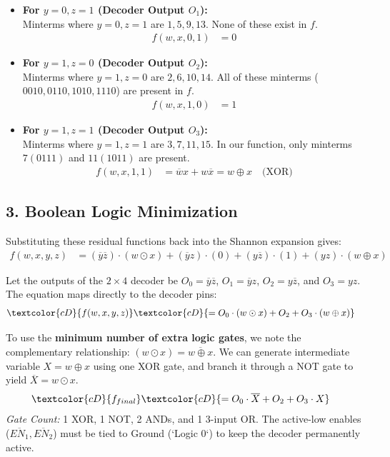\documentclass[12pt,a3paper]{article}
\begin{document}
\begin{enumerate}
\begin{tcolorbox}[enhanced,breakable,ansbox,colback=cD!4,colframe=cD,boxrule=0.8pt,arc=5pt,title={\textbf{Answer}},fonttitle=\bfseries\color{white},colbacktitle=cD]
\begin{itemize}
    \item \textbf{For $y=0, z=1$ (Decoder Output $O_1$):}\\
    Minterms where $y=0, z=1$ are $1, 5, 9, 13$. None of these exist in $f$.
    \begin{align*}
        f(w,x,0,1) &= 0
    \end{align*}
    
    \item \textbf{For $y=1, z=0$ (Decoder Output $O_2$):}\\
    Minterms where $y=1, z=0$ are $2, 6, 10, 14$. All of these minterms ($0010, 0110, 1010, 1110$) are present in $f$.
    \begin{align*}
        f(w,x,1,0) &= 1
    \end{align*}
    
    \item \textbf{For $y=1, z=1$ (Decoder Output $O_3$):}\\
    Minterms where $y=1, z=1$ are $3, 7, 11, 15$. In our function, only minterms $7 (0111)$ and $11 (1011)$ are present.
    \begin{align*}
        f(w,x,1,1) &= \overline{w}x + w\overline{x} = w \oplus x \quad \text{(XOR)}
    \end{align*}
\end{itemize}

\subsection*{3. Boolean Logic Minimization}
Substituting these residual functions back into the Shannon expansion gives:
\begin{align*}
    f(w,x,y,z) &= (\overline{y}\overline{z}) \cdot (w \odot x) + (\overline{y}z) \cdot (0) + (y\overline{z}) \cdot (1) + (yz) \cdot (w \oplus x)
\end{align*}

Let the outputs of the $2 \times 4$ decoder be $O_0 = \overline{y}\overline{z}$, $O_1 = \overline{y}z$, $O_2 = y\overline{z}$, and $O_3 = yz$. The equation maps directly to the decoder pins:
\begin{align*}
    \textcolor{cD}{f(w,x,y,z)} &\textcolor{cD}{= O_0 \cdot (w \odot x) + O_2 + O_3 \cdot (w \oplus x)}
\end{align*}

To use the \textbf{minimum number of extra logic gates}, we note the complementary relationship: $(w \odot x) = \overline{w \oplus x}$. We can generate intermediate variable $X = w \oplus x$ using one XOR gate, and branch it through a NOT gate to yield $\overline{X} = w \odot x$. 
\begin{align*}
    \textcolor{cD}{f_{final}} &\textcolor{cD}{= O_0 \cdot \overline{X} + O_2 + O_3 \cdot X}
\end{align*}
\textit{Gate Count:} 1 XOR, 1 NOT, 2 ANDs, and 1 3-input OR. The active-low enables ($\overline{EN_1}, \overline{EN_2}$) must be tied to Ground (`Logic 0`) to keep the decoder permanently active.


\end{tcolorbox}
\end{enumerate}
\end{document}
